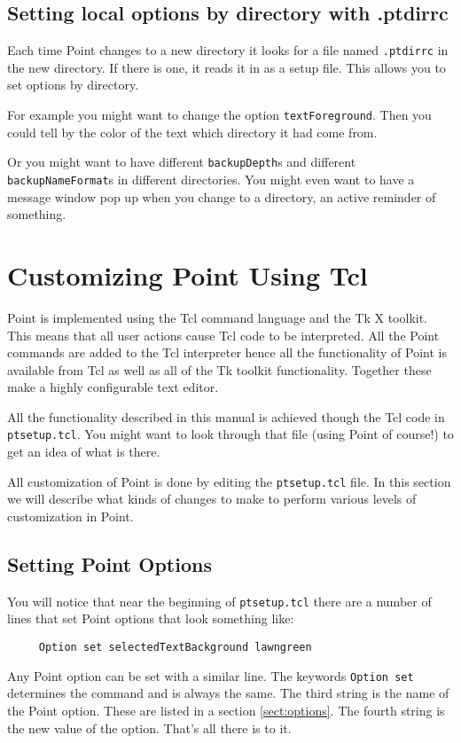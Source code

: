\subsection{Setting local options by directory with .ptdirrc}

Each time Point changes to a new directory it looks for a
file named {\tt .ptdirrc} in the new directory.
If there is one, it reads it in as a setup file.
This allows you to set options by directory.

For example you might want to change the option {\tt textForeground}.
Then you could tell by the color of the text which directory
it had come from.

Or you might want to have different {\tt backupDepth}s and
different {\tt backupNameFormat}s in different directories.
You might even want to have a message window pop up when
you change to a directory, an active reminder of something.






\section{Customizing Point Using Tcl} \label{sect:customize2}

Point is implemented using the Tcl command language and the Tk X toolkit.
This means that all user actions cause Tcl code to be interpreted.
All the Point commands are added to the Tcl interpreter hence all the
functionality of Point is available from Tcl
as well as  all of the Tk toolkit functionality.
Together these make a highly configurable text editor.

All the functionality described in this manual is achieved though
the Tcl code in {\tt ptsetup.tcl}.
You might want to look through that file (using Point of course!)
to get an idea of what is there.

All customization of Point is done by editing the {\tt ptsetup.tcl} file.
In this section we will describe what kinds of changes to make
to perform various levels of customization in Point.


\subsection{Setting Point Options}

You will notice that near the beginning of {\tt ptsetup.tcl}
there are a number of lines that set Point options that look something like:
\begin{verbatim}
     Option set selectedTextBackground lawngreen
\end{verbatim}
Any Point option can be set with a similar line.
The keywords {\tt Option set} determines the command and is
always the same.
The third string is the name of the Point option.
These are listed in a section \ref{sect:options}.
The fourth string is the new value of the option.
That's all there is to it.

